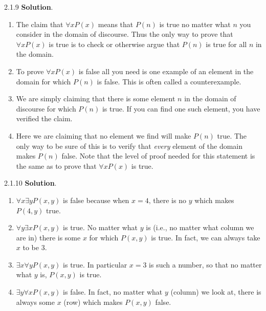 \documentclass[11pt,]{book}
\theoremstyle{ptxplainnotitle}
\theoremstyle{ptxplaintitle}
\theoremstyle{ptxdefinitionnotitle}
\theoremstyle{ptxdefinitiontitle}
\theoremstyle{ptxdefinitionnotitle}
\theoremstyle{ptxdefinitiontitle}
\theoremstyle{ptxdefinitionnotitle}
\theoremstyle{ptxdefinitiontitle}
\theoremstyle{ptxdefinitiontitlenonumber}
\theoremstyle{ptxdefinitiontitlenonumber}
\numberwithin{equation}{chapter}
\begin{document}
\begin{divisionexercise}{2.1.9}
\textbf{Solution}.\quad%
\hypertarget{p-2227}{}%
\leavevmode%
\begin{enumerate}[label=\alph*.]
\item\hypertarget{li-1105}{}\hypertarget{p-2228}{}%
The claim that \(\forall x P(x)\) means that \(P(n)\) is true no matter what \(n\) you consider in the domain of discourse.  Thus the only way to prove that \(\forall x P(x)\) is true is to check or otherwise argue that \(P(n)\) is true for all \(n\) in the domain.%
\item\hypertarget{li-1106}{}\hypertarget{p-2229}{}%
To prove \(\forall x P(x)\) is false all you need is one example of an element in the domain for which \(P(n)\) is false.  This is often called a counterexample.%
\item\hypertarget{li-1107}{}\hypertarget{p-2230}{}%
We are simply claiming that there is some element \(n\) in the domain of discourse for which \(P(n)\) is true.  If you can find one such element, you have verified the claim.%
\item\hypertarget{li-1108}{}\hypertarget{p-2231}{}%
Here we are claiming that no element we find will make \(P(n)\) true.  The only way to be sure of this is to verify that \emph{every} element of the domain makes \(P(n)\) false.  Note that the level of proof needed for this statement is the same as to prove that \(\forall x P(x)\) is true.%
\end{enumerate}
%
\end{divisionexercise}%
\begin{divisionexercise}{2.1.10}
\textbf{Solution}.\quad%
\hypertarget{p-2265}{}%
\leavevmode%
\begin{enumerate}[label=\alph*.]
\item\hypertarget{li-1137}{}\hypertarget{p-2266}{}%
\(\forall x \exists y P(x,y)\) is false because when \(x = 4\text{,}\) there is no \(y\) which makes \(P(4,y)\) true.%
\item\hypertarget{li-1138}{}\hypertarget{p-2267}{}%
\(\forall y \exists x P(x,y)\) is true.  No matter what \(y\) is (i.e., no matter what column we are in) there is some \(x\) for which \(P(x,y)\) is true.  In fact, we can always take \(x\) to be \(3\text{.}\)%
\item\hypertarget{li-1139}{}\hypertarget{p-2268}{}%
\(\exists x \forall y P(x,y)\) is true. In particular \(x=3\) is such a number, so that no matter what \(y\) is, \(P(x,y)\) is true.%
\item\hypertarget{li-1140}{}\hypertarget{p-2269}{}%
\(\exists y \forall x P(x,y)\) is false. In fact, no matter what \(y\) (column) we look at, there is always some \(x\) (row) which makes \(P(x,y)\) false.%
\end{enumerate}
%
\end{divisionexercise}%
\end{document}
